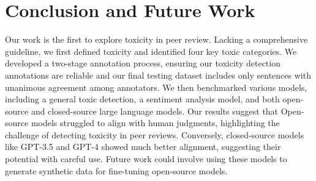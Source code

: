 \section{Conclusion and Future Work}
Our work is the first to explore toxicity in peer review. Lacking a comprehensive guideline, we first defined toxicity and identified four key toxic categories. We developed a two-stage annotation process, ensuring our toxicity detection annotations are reliable and our final testing dataset includes only sentences with unanimous agreement among annotators. 
We then benchmarked various models, including a general toxic detection, a sentiment analysis model, and both open-source and closed-source large language models. Our results suggest that Open-source models struggled to align with human judgments, highlighting the challenge of detecting toxicity in peer reviews. Conversely, closed-source models like GPT-3.5 and GPT-4 showed much better alignment, suggesting their potential with careful use. Future work could involve using these models to generate synthetic data for fine-tuning open-source models.

